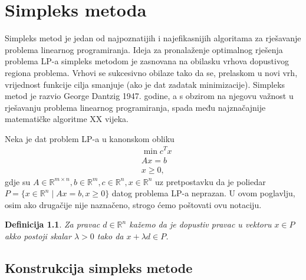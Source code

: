 \documentclass[b5paper, utf8, 11pt, colorlinks]{book}
\newtheorem{definition}{Definicija}[chapter]
\theoremstyle{definition}
\begin{document}
\newpage 
\newpage 
\chapter{Simpleks metoda}\label{chp:simpleks}

Simpleks metod je jedan od najpoznatijih i najefikasnijih algoritama za rješavanje problema linearnog programiranja. Ideja za pronalaženje optimalnog rješenja problema LP-a simpleks metodom je zasnovana na  obilasku vrhova dopustivog regiona problema. Vrhovi se sukcesivno obilaze tako da se, prelaskom u novi vrh, vrijednost funkcije cilja smanjuje (ako je dat zadatak minimizacije). Simpleks metod je razvio George Dantzig 1947. godine, a s obzirom na njegovu važnost u rješavanju problema linearnog programiranja, spada među najznačajnije matematičke algoritme XX vijeka.

Neka je dat problem LP-a u kanonskom obliku
\begin{align}
	&\min c^Tx  \nonumber \\ 
	& A x = b \nonumber \\
	& x \geq 0, \label{eq:lp_equality_constraint}
\end{align}
gdje su $A \in \mathbb{R}^{m \times n}, b \in \mathbb{R}^m, c \in \mathbb{R}^n, x\in \mathbb{R}^n$ uz pretpostavku da je poliedar $P=\{ x \in \mathbb{R}^n \mid A x = b , x \geq 0 \}$ datog problema LP-a neprazan.  U ovom poglavlju, osim ako drugačije nije naznačeno, strogo ćemo poštovati ovu notaciju. 


\begin{definition}
	Za pravac $d\in \mathbb{R}^n$ kažemo da je dopustiv pravac u vektoru $x \in P$ akko postoji skalar $\lambda > 0$ tako da $x + \lambda d \in P$.
\end{definition}

\section{Konstrukcija simpleks metode}
\end{document}
